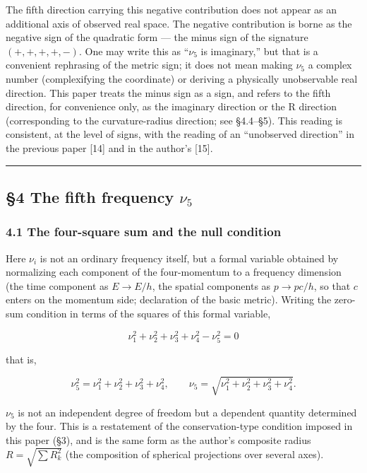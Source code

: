 \documentclass[
]{article}
\begin{document}
The fifth direction carrying this negative contribution does not appear
as an additional axis of observed real space. The negative contribution
is borne as the negative sign of the quadratic form --- the minus sign
of the signature \((+,+,+,+,-)\). One may write this as ``\(\nu_5\) is
imaginary,'' but that is a convenient rephrasing of the metric sign; it
does not mean making \(\nu_5\) a complex number (complexifying the
coordinate) or deriving a physically unobservable real direction. This
paper treats the minus sign as a sign, and refers to the fifth
direction, for convenience only, as the imaginary direction or the R
direction (corresponding to the curvature-radius direction; see
§4.4--§5). This reading is consistent, at the level of signs, with the
reading of an ``unobserved direction'' in the previous paper {[}14{]}
and in the author's {[}15{]}.

\begin{center}\rule{0.5\linewidth}{0.5pt}\end{center}

\subsection{\texorpdfstring{§4 The fifth frequency
\(\nu_5\)}{§4 The fifth frequency \textbackslash nu\_5}}\label{the-fifth-frequency-nu_5}

\subsubsection{4.1 The four-square sum and the null
condition}\label{the-four-square-sum-and-the-null-condition}

Here \(\nu_i\) is not an ordinary frequency itself, but a formal
variable obtained by normalizing each component of the four-momentum to
a frequency dimension (the time component as \(E\to E/h\), the spatial
components as \(p\to pc/h\), so that \(c\) enters on the momentum side;
declaration of the basic metric). Writing the zero-sum condition in
terms of the squares of this formal variable,

\[\nu_1^2+\nu_2^2+\nu_3^2+\nu_4^2-\nu_5^2=0\]

that is,

\[\nu_5^2=\nu_1^2+\nu_2^2+\nu_3^2+\nu_4^2,\qquad \nu_5=\sqrt{\nu_1^2+\nu_2^2+\nu_3^2+\nu_4^2}.\]

\(\nu_5\) is not an independent degree of freedom but a dependent
quantity determined by the four. This is a restatement of the
conservation-type condition imposed in this paper (§3), and is the same
form as the author's composite radius \(R=\sqrt{\sum R_k^2}\) (the
composition of spherical projections over several axes).
\end{document}
